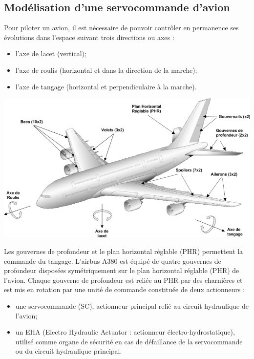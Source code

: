 \documentclass[10pt,fleqn]{article} %
\begin{document}

\vspace{5cm}
\pagestyle{fancy}
\thispagestyle{plain}

\def\columnseprulecolor{\color{ocre}}
\setlength{\columnseprule}{0.4pt} 

\def\pathfig{images}

\begin{multicols}{2}
\subsection*{Modélisation d'une servocommande d'avion}

\ifprof \else 
Pour piloter un avion, il est nécessaire de pouvoir contrôler en permanence ses évolutions dans l'espace suivant trois directions ou axes : 
\begin{itemize}
\item l'axe de lacet (vertical);
\item l'axe de roulis (horizontal et dans la direction de la marche);
\item l'axe de tangage (horizontal et perpendiculaire à la marche).
\end{itemize}


\begin{center}
\includegraphics[width=.95\linewidth]{images/img2}
\end{center}

Les gouvernes de profondeur et le plan horizontal réglable (PHR) permettent la commande du tangage. L'airbus A380 est équipé de quatre gouvernes de profondeur disposées symétriquement sur le plan horizontal réglable (PHR) de l'avion. Chaque gouverne de profondeur est reliée au PHR par des charnières et est mis en rotation par une unité de commande constituée de deux actionneurs :
\begin{itemize}
\item une servocommande (SC), actionneur principal relié au circuit hydraulique de l'avion;
\item un EHA (Electro Hydraulic Actuator : actionneur électro-hydrostatique), utilisé comme organe de sécurité en cas de défaillance de la servocommande ou du circuit hydraulique principal.
\end{itemize}


\end{multicols}
\end{document}

